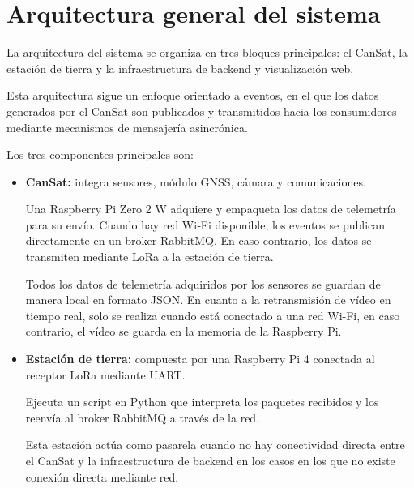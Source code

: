 \section{Arquitectura general del sistema}
La arquitectura del sistema se organiza en tres bloques principales: el CanSat, la estación de tierra y la infraestructura de backend y visualización web.

Esta arquitectura sigue un enfoque orientado a eventos, en el que los datos generados por el CanSat son publicados y transmitidos hacia los consumidores mediante mecanismos de mensajería asincrónica.

Los tres componentes principales son:

\begin{itemize}
    \item \textbf{CanSat: }integra sensores, módulo GNSS, cámara y comunicaciones.

    Una Raspberry Pi Zero 2 W adquiere y empaqueta los datos de telemetría para su envío.
    Cuando hay red Wi‑Fi disponible, los eventos se publican directamente en un broker RabbitMQ. En caso contrario, los datos se transmiten mediante LoRa a la estación de tierra.

    Todos los datos de telemetría adquiridos por los sensores se guardan de manera local en formato JSON.
    En cuanto a la retransmisión de vídeo en tiempo real, solo se realiza cuando está conectado a una red Wi-Fi, en caso contrario, el vídeo se guarda en la memoria de la Raspberry Pi.

    \item \textbf{Estación de tierra: }compuesta por una Raspberry Pi 4 conectada al receptor LoRa mediante UART.

    Ejecuta un script en Python que interpreta los paquetes recibidos y los reenvía al broker RabbitMQ a través de la red.

    Esta estación actúa como pasarela cuando no hay conectividad directa entre el CanSat y la infraestructura de backend en los casos en los que no existe conexión directa mediante red.


\end{itemize}

